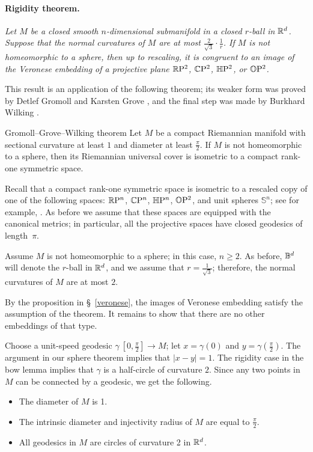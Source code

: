 \documentclass[a4paper,10pt]{article}
\begin{document}
\paragraph{Rigidity theorem.}\label{thm:=}
\textit{Let $M$ be a closed smooth $n$-dimensional submanifold in a closed $r$-ball in $\mathbb{R}^d$.
Suppose that the normal curvatures of $M$ are at most $\tfrac2{\sqrt{3}}\cdot\tfrac1r$.
If $M$ is not homeomorphic to a sphere, then up to rescaling, it is congruent to an image of the Veronese embedding of a projective plane $\mathbb{R}\mathrm{P}^2$, $\mathbb{C}\mathrm{P}^2$, $\mathbb{H}\mathrm{P}^2$, or $\mathbb{O}\mathrm{P}^2$.}

\medskip


This result is an application of the following theorem;
its weaker form was proved by Detlef Gromoll and Karsten Grove \cite{gromoll-grove}, and
the final step was made by Burkhard Wilking \cite{wilking}.

\begin{thm}{Gromoll--Grove--Wilking theorem}\label{thm:GGW}
Let $M$ be a compact Riemannian manifold with sectional curvature at least $1$ and
diameter at least $\tfrac\pi2$.
If $M$ is not homeomorphic to a sphere, then its Riemannian universal cover is isometric to a compact rank-one symmetric space.
\end{thm}

Recall that a compact rank-one symmetric space is isometric to a rescaled copy of one of the following spaces:
$\mathbb{R}\mathrm{P}^n$, $\mathbb{C}\mathrm{P}^n$, $\mathbb{H}\mathrm{P}^n$, $\mathbb{O}\mathrm{P}^2$, and unit spheres $\mathbb{S}^n$; see for example, \cite[8.12.2]{wolf}.
As before we assume that these spaces are equipped with the canonical metrics;
in particular, all the projective spaces have closed geodesics of length~$\pi$.

Assume $M$ is not homeomorphic to a sphere;
in this case, $n\ge 2$.
As before, $\mathbb{B}^d$ will denote the $r$-ball in $\mathbb{R}^d$, and we assume that $r=\tfrac1{\sqrt{3}}$;
therefore, the normal curvatures of $M$ are at most $2$.

By the proposition in §~\ref{veronese}, the images of Veronese embedding satisfy the assumption of the theorem.
It remains to show that there are no other embeddings of that type.


Choose a unit-speed geodesic $\gamma\:[0,\tfrac\pi2]\to M$;
let $x=\gamma(0)$ and $y=\gamma(\tfrac\pi2)$.
The argument in our sphere theorem implies that $|x-y|=1$.
The rigidity case in the bow lemma implies that $\gamma$ is a half-circle of curvature $2$.
Since any two points in $M$ can be connected by a geodesic, we get the following.
\begin{itemize}
 \item The diameter of $M$ is 1.
 \item The intrinsic diameter and injectivity radius of $M$ are equal to $\tfrac\pi2$.
 \item All geodesics in $M$ are circles of curvature 2 in $\mathbb{R}^d$.
\end{itemize}
\end{document}
